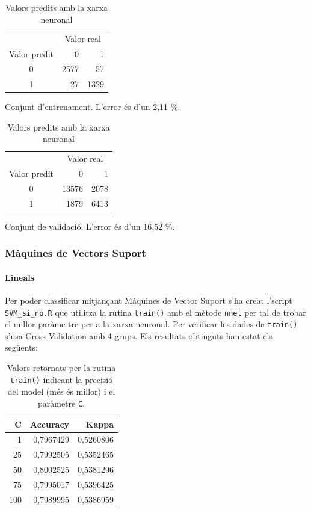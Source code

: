 \documentclass[a4paper]{article}
\begin{document}
\begin{table}[H]
	\def\arraystretch{1.2}
	\begin{subtable}[t]{0.49\textwidth}
		\centering
		\begin{tabular}{|c|rr|}
			\hline
			& \multicolumn{2}{c|}{Valor real} \\
			Valor predit & 0 & 1 \\
			\hline
			0 & 2577 & 57 \\
			1 &   27 & 1329 \\
			\hline
		\end{tabular}
		\caption{Conjunt d'entrenament. L'error és d'un 2,11 \%.}
		\label{tab:nnet_yes_no1}
	\end{subtable}
	\hfill
	\begin{subtable}[t]{0.49\textwidth}
		\centering
		\begin{tabular}{|c|rr|}
			\hline
			& \multicolumn{2}{c|}{Valor real} \\
			Valor predit & 0 & 1 \\
			\hline
			0 & 13576 & 2078 \\
			1 &  1879 & 6413 \\
			\hline
		\end{tabular}
		\caption{Conjunt de validació. L'error és d'un 16,52 \%.}
		\label{tab:nnet_yes_no2}
	\end{subtable}
	\caption{Valors predits amb la xarxa neuronal}
\end{table}

\subsubsection{Màquines de Vectors Suport}
\paragraph{Lineals}

Per poder classificar mitjançant Màquines de Vector Suport s’ha creat l’script \verb|SVM_si_no.R| que utilitza la rutina \verb|train()| amb el mètode \verb|nnet| per tal de trobar el millor paràme	tre per a la xarxa neuronal. Per verificar les dades de \verb|train()| s’usa Cross-Validation amb 4 grups. Els resultats obtinguts han estat els següents: 

\begin{table}[H]
	\centering
	\def\arraystretch{1.2}
	\begin{tabular}{|rrr|}
		\hline
		C & Accuracy & Kappa \\
		\hline
		1 & 0,7967429 & 0,5260806 \\
		25 & 0,7992505 & 0,5352465 \\
		\rowcolor{Orange!40}
		50 & 0,8002525 & 0,5381296 \\
		75 & 0,7995017 & 0,5396425 \\
		100 & 0,7989995 & 0,5386959 \\
		\hline
	\end{tabular}
	\captionsetup{width=0.6\textwidth}
	\caption{Valors retornats per la rutina \texttt{train()} indicant la precisió del model (més és millor) i el paràmetre \texttt{C}.}
\end{table}
\end{document}

